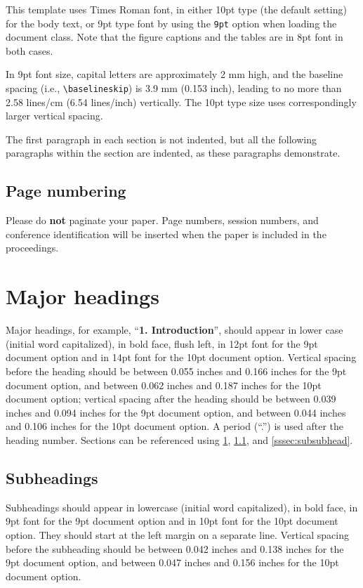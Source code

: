 \documentclass[9pt]{ieeeconf}
\begin{document}
This template uses Times Roman font, in either 10pt type (the default setting)
for the body text, or 9pt type font by using the \texttt{9pt} option when
loading the document class. Note that the figure captions and the tables are in
8pt font in both cases.

In 9pt font size, capital letters are approximately 2 mm high, and the baseline
spacing (i.e., \texttt{\textbackslash{baselineskip}}) is 3.9 mm (0.153 inch),
leading to no more than 2.58 lines/cm (6.54 lines/inch) vertically. The 10pt
type size uses correspondingly larger vertical spacing.

The first paragraph in each section is not indented, but all the following
paragraphs within the section are indented, as these paragraphs demonstrate.

\subsection{Page numbering}
\label{sec:page}

Please do {\bf not} paginate your paper. Page numbers, session numbers, and
conference identification will be inserted when the paper is included in the
proceedings.


\section{Major headings}
\label{sec:majhead}

Major headings, for example, ``{\bf 1. Introduction}'', should appear in lower
case (initial word capitalized), in bold face, flush left, in 12pt font for the
9pt document option and in 14pt font for the 10pt document option. Vertical
spacing before the heading should be between 0.055 inches and 0.166 inches for
the 9pt document option, and between 0.062 inches and 0.187 inches for the 10pt
document option; vertical spacing after the heading should be between 0.039
inches and 0.094 inches for the 9pt document option, and between 0.044 inches
and 0.106 inches for the 10pt document option. A period (``.'') is used after
the heading number. Sections can be referenced using \cref{sec:majhead},
\cref{ssec:subhead}, and \cref{sssec:subsubhead}.

\subsection{Subheadings}
\label{ssec:subhead}

Subheadings should appear in lowercase (initial word capitalized), in bold face,
in 9pt font for the 9pt document option and in 10pt font for the 10pt document
option. They should start at the left margin on a separate line. Vertical
spacing before the subheading should be between 0.042 inches and 0.138 inches
for the 9pt document option, and between 0.047 inches and 0.156 inches for the
10pt document option.
\end{document}
